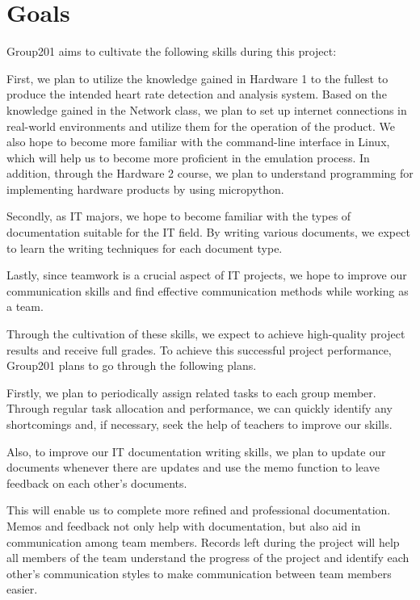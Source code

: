 \documentclass{article}
\begin{document}
\section{Goals}
Group201 aims to cultivate the following skills during this project:



First, we plan to utilize the knowledge gained in Hardware 1 to the fullest to produce the intended heart rate detection and analysis system. Based on the knowledge gained in the Network class, we plan to set up internet connections in real-world environments and utilize them for the operation of the product. We also hope to become more familiar with the command-line interface in Linux, which will help us to become more proficient in the emulation process. In addition, through the Hardware 2 course, we plan to understand programming for implementing hardware products by using micropython.



Secondly, as IT majors, we hope to become familiar with the types of documentation suitable for the IT field. By writing various documents, we expect to learn the writing techniques for each document type.



Lastly, since teamwork is a crucial aspect of IT projects, we hope to improve our communication skills and find effective communication methods while working as a team.



Through the cultivation of these skills, we expect to achieve high-quality project results and receive full grades. To achieve this successful project performance, Group201 plans to go through the following plans.



Firstly, we plan to periodically assign related tasks to each group member. Through regular task allocation and performance, we can quickly identify any shortcomings and, if necessary, seek the help of teachers to improve our skills.



Also, to improve our IT documentation writing skills, we plan to update our documents whenever there are updates and use the memo function to leave feedback on each other's documents.



This will enable us to complete more refined and professional documentation. Memos and feedback not only help with documentation, but also aid in communication among team members. Records left during the project will help all members of the team understand the progress of the project and identify each other's communication styles to make communication between team members easier.
\end{document}
